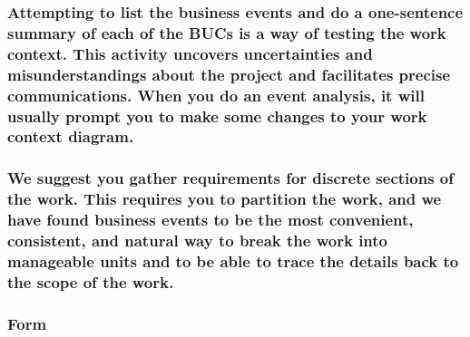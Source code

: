 \documentclass[
]{article}
\begin{document}
\hypertarget{attempting-to-list-the-business-events-and-do-a-one-sentence-summary-of-each-of-the-bucs-is-a-way-of-testing-the-work-context.-this-activity-uncovers-uncertainties-and-misunderstandings-about-the-project-and-facilitates-precise-communications.-when-you-do-an-event-analysis-it-will-usually-prompt-you-to-make-some-changes-to-your-work-context-diagram.}{%
\subsubsection{Attempting to list the business events and do a
one-sentence summary of each of the BUCs is a way of testing the work
context. This activity uncovers uncertainties and misunderstandings
about the project and facilitates precise communications. When you do an
event analysis, it will usually prompt you to make some changes to your
work context
diagram.}\label{attempting-to-list-the-business-events-and-do-a-one-sentence-summary-of-each-of-the-bucs-is-a-way-of-testing-the-work-context.-this-activity-uncovers-uncertainties-and-misunderstandings-about-the-project-and-facilitates-precise-communications.-when-you-do-an-event-analysis-it-will-usually-prompt-you-to-make-some-changes-to-your-work-context-diagram.}}

\hypertarget{we-suggest-you-gather-requirements-for-discrete-sections-of-the-work.-this-requires-you-to-partition-the-work-and-we-have-found-business-events-to-be-the-most-convenient-consistent-and-natural-way-to-break-the-work-into-manageable-units-and-to-be-able-to-trace-the-details-back-to-the-scope-of-the-work.}{%
\subsubsection{We suggest you gather requirements for discrete sections
of the work. This requires you to partition the work, and we have found
business events to be the most convenient, consistent, and natural way
to break the work into manageable units and to be able to trace the
details back to the scope of the
work.}\label{we-suggest-you-gather-requirements-for-discrete-sections-of-the-work.-this-requires-you-to-partition-the-work-and-we-have-found-business-events-to-be-the-most-convenient-consistent-and-natural-way-to-break-the-work-into-manageable-units-and-to-be-able-to-trace-the-details-back-to-the-scope-of-the-work.}}

\hypertarget{form-22}{%
\subsubsection{Form}\label{form-22}}
\end{document}
